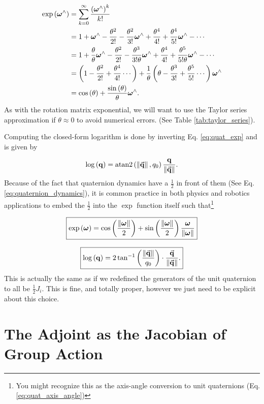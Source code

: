 \begin{align}
\exp\left(\omegabf^{\wedge}\right) & =\sum_{k=0}^{\infty}\frac{\left(\omegabf^{\wedge}\right)^{k}}{k!}\nonumber \\
 & =1+\omegabf^{\wedge}-\frac{\theta^{2}}{2!}-\frac{\theta^{2}}{3!}\omegabf^{\wedge}+\frac{\theta^{4}}{4!}+\frac{\theta^{4}}{5!}\omegabf^{\wedge}-\cdots\nonumber \\
 & =1+\frac{\theta}{\theta}\omegabf^{\wedge}-\frac{\theta^{2}}{2!}-\frac{\theta^{3}}{3!\theta}\omegabf^{\wedge}+\frac{\theta^{4}}{4!}+\frac{\theta^{5}}{5!\theta}\omegabf^{\wedge}-\cdots\nonumber \\
 & =\left(1-\frac{\theta^{2}}{2!}+\frac{\theta^{4}}{4!}\cdots\right)+\frac{1}{\theta}\left(\theta-\frac{\theta^{3}}{3!}+\frac{\theta^{5}}{5!}\cdots\right)\omegabf^{\wedge}\nonumber \\
 & =\cos\left(\theta\right)+\frac{\sin\left(\theta\right)}{\theta}\omegabf^{\wedge}.\label{eq:quat_exp}
\end{align}
As with the rotation matrix exponential, we will want to use the Taylor
series approximation if $\theta\approx0$ to avoid numerical errors.
(See Table \ref{tab:taylor_series}).

Computing the closed-form logarithm is done by inverting Eq. \ref{eq:quat_exp}
and is given by

\[
\log\left(\mathbf{q}\right)=\textnormal{atan2}\left(\left\|\vec{\mathbf{q}}\right\|,q_{0}\right)\frac{\mathbf{q}}{\left\|\vec{\mathbf{q}}\right\|}.
\]
Because of the fact that quaternion dynamics have a $\frac{1}{2}$
in front of them (See Eq. \ref{eq:quaternion_dynamics}), it is common
practice in both physics and robotics applications to embed the $\frac{1}{2}$
into the $\exp$ function itself such that\footnote{You might recognize this as the axis-angle conversion to unit quaternions
(Eq. \ref{eq:quat_axis_angle})}

\[
\boxed{\exp\left(\boldsymbol{\omega}\right)=\cos\left(\frac{\left\|\boldsymbol{\omega}\right\|}{2}\right)+\sin\left(\frac{\left\|\boldsymbol{\omega}\right\|}{2}\right)\frac{\boldsymbol{\omega}}{\left\|\boldsymbol{\omega}\right\|}}
\]

\[
\boxed{\log\left(\mathbf{q}\right)=2\tan^{-1}\left(\frac{\left\|\vec{\mathbf{q}}\right\|}{q_{0}}\right)\cdot\frac{\vec{\mathbf{q}}}{\left\|\vec{\mathbf{q}}\right\|}.}
\]
This is actually the same as if we redefined the generators of the
unit quaternion to all be $\frac{1}{2}J_{i}$. This is fine, and totally
proper, however we just need to be explicit about this choice.

\section{The Adjoint as the Jacobian of Group Action}

